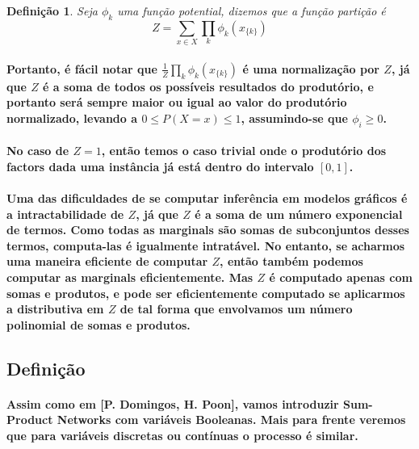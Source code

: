 \documentclass[a4paper,10pt]{article}
\theoremstyle{plain}
\newtheorem*{spn-def}{Definição}
\begin{document}
\begin{spn-def} Seja $\phi_k$ uma função potential, dizemos que a função partição é
  \begin{equation}
    Z = \sum_{x \in X} \prod_k \phi_k (x_{\{k\}})
  \end{equation}
\end{spn-def}

\paragraph{
  Portanto, é fácil notar que $\frac{1}{Z} \prod_k \phi_k (x_{\{k\}})$ é uma normalização por $Z$,
  já que $Z$ é a soma de todos os possíveis resultados do produtório, e portanto será sempre maior
  ou igual ao valor do produtório normalizado, levando a $0 \leq P(X = x) \leq 1$, assumindo-se que
  $\phi_i \geq 0$.
}

\paragraph{
  No caso de $Z=1$, então temos o caso trivial onde o produtório dos factors dada uma instância já
  está dentro do intervalo $[0,1]$.
}

\paragraph{
  Uma das dificuldades de se computar inferência em modelos gráficos é a intractabilidade de $Z$,
  já que $Z$ é a soma de um número exponencial de termos. Como todas as marginals\cite{report-5}
  são somas de subconjuntos desses termos, computa-las é igualmente intratável. No entanto, se
  acharmos uma maneira eficiente de computar $Z$, então também podemos computar as marginals
  eficientemente. Mas $Z$ é computado apenas com somas e produtos, e pode ser eficientemente
  computado se aplicarmos a distributiva em $Z$ de tal forma que envolvamos um número polinomial de
  somas e produtos.
}

\subsection{Definição}

\paragraph{
  Assim como em [P. Domingos, H. Poon]\cite{poon-domingos}, vamos introduzir Sum-Product Networks
  com variáveis Booleanas. Mais para frente veremos que para variáveis discretas ou contínuas o
  processo é similar.
}
\end{document}
